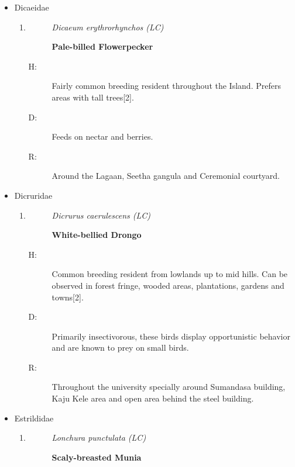 \begin{itemize}
\begin{enumerate}
\end{enumerate}%
\item%
Dicaeidae%
\begin{enumerate}%
\item%
\begin{description}%
\item[]%
\textit{Dicaeum erythrorhynchos (LC)}%
\item[]%
\textbf{Pale{-}billed Flowerpecker}%
\end{description}%
\begin{description}%
\item[H: ]%
Fairly common breeding resident throughout the Island. Prefers areas with tall trees{[}2{]}.%
\item[D: ]%
Feeds on nectar and berries.%
\item[R: ]%
Around the Lagaan, Seetha gangula and Ceremonial courtyard.%
\end{description}%
\end{enumerate}%
\item%
Dicruridae%
\begin{enumerate}%
\item%
\begin{description}%
\item[]%
\textit{Dicrurus caerulescens (LC)}%
\item[]%
\textbf{White{-}bellied Drongo}%
\end{description}%
\begin{description}%
\item[H: ]%
Common breeding resident from lowlands up to mid hills. Can be observed in forest fringe, wooded areas, plantations, gardens and towns{[}2{]}.%
\item[D: ]%
Primarily insectivorous, these birds display opportunistic behavior and are known to prey on small birds.%
\item[R: ]%
Throughout the university specially around Sumandasa building, Kaju Kele area and open area behind the steel building.%
\end{description}%
\end{enumerate}%
\item%
Estrildidae%
\begin{enumerate}%
\item%
\begin{description}%
\item[]%
\textit{Lonchura punctulata (LC)}%
\item[]%
\textbf{Scaly{-}breasted Munia}%
\end{description}%

\end{enumerate}
\end{itemize}
